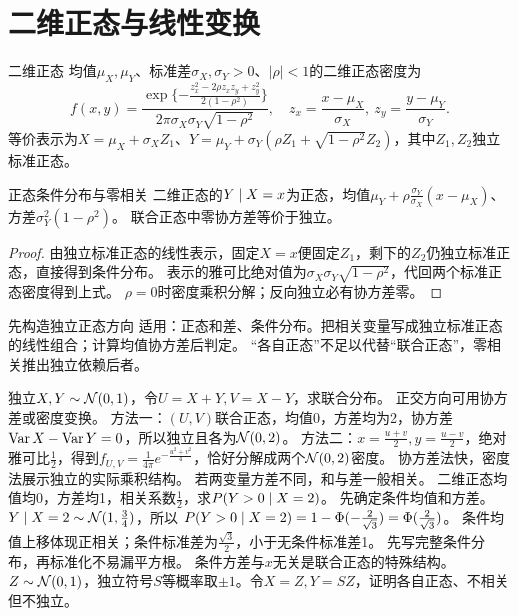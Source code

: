 \section{二维正态与线性变换}\label{sec:35}
\begin{definition}{二维正态}
均值$\mu_X,\mu_Y$、标准差$\sigma_X,\sigma_Y>0$、$|\rho|<1$的二维正态密度为
\[f(x,y)=\dfrac{\exp\{-\frac{z_x^2-2\rho z_xz_y+z_y^2}{2(1-\rho^2)}\}}{2\pi\sigma_X\sigma_Y\sqrt{1-\rho^2}},
\quad z_x=\dfrac{x-\mu_X}{\sigma_X},\ z_y=\dfrac{y-\mu_Y}{\sigma_Y}.\]
等价表示为$X=\mu_X+\sigma_XZ_1$、$Y=\mu_Y+\sigma_Y(\rho Z_1+\sqrt{1-\rho^2}Z_2)$，其中$Z_1,Z_2$独立标准正态。
\end{definition}
\begin{theorem}{正态条件分布与零相关}
二维正态的$Y\mid X=x$为正态，均值$\mu_Y+\rho\frac{\sigma_Y}{\sigma_X}(x-\mu_X)$、方差$\sigma_Y^2(1-\rho^2)$。
联合正态中零协方差等价于独立。
\end{theorem}
\begin{proof}
由独立标准正态的线性表示，固定$X=x$便固定$Z_1$，剩下的$Z_2$仍独立标准正态，直接得到条件分布。
表示的雅可比绝对值为$\sigma_X\sigma_Y\sqrt{1-\rho^2}$，代回两个标准正态密度得到上式。
$\rho=0$时密度乘积分解；反向独立必有协方差零。
\end{proof}
\begin{method}{先构造独立正态方向}
适用：正态和差、条件分布。把相关变量写成独立标准正态的线性组合；计算均值协方差后判定。
“各自正态”不足以代替“联合正态”，零相关推出独立依赖后者。
\end{method}
{独立$X,Y\sim\mathcal N(0,1)$，令$U=X+Y,V=X-Y$，求联合分布。}
{正交方向可用协方差或密度变换。}
{方法一：$(U,V)$联合正态，均值0，方差均为2，协方差$\operatorname{Var} X-\operatorname{Var} Y=0$，所以独立且各为$\mathcal N(0,2)$。
方法二：$x=\frac{u+v}{2},y=\frac{u-v}{2}$，绝对雅可比$\frac{1}{2}$，得到$f_{U,V}=\frac1{4\pi}e^{-\frac{u^2+v^2}{4}}$，恰好分解成两个$\mathcal N(0,2)$密度。}
{协方差法快，密度法展示独立的实际乘积结构。}
{若两变量方差不同，和与差一般相关。}
{二维正态均值均0，方差均1，相关系数$\frac{1}{2}$，求$P(Y>0\mid X=2)$。}
{先确定条件均值和方差。}
{$Y\mid X=2\sim\mathcal N(1,\frac{3}{4})$，所以
$P(Y>0\mid X=2)=1-\Phi(-\frac{2}{\sqrt3})=\Phi(\frac{2}{\sqrt3})$。
条件均值上移体现正相关；条件标准差为$\frac{\sqrt3}{2}$，小于无条件标准差1。}
{先写完整条件分布，再标准化不易漏平方根。}
{条件方差与$x$无关是联合正态的特殊结构。}
{$Z\sim\mathcal N(0,1)$，独立符号$S$等概率取$\pm1$。令$X=Z,Y=SZ$，证明各自正态、不相关但不独立。}
